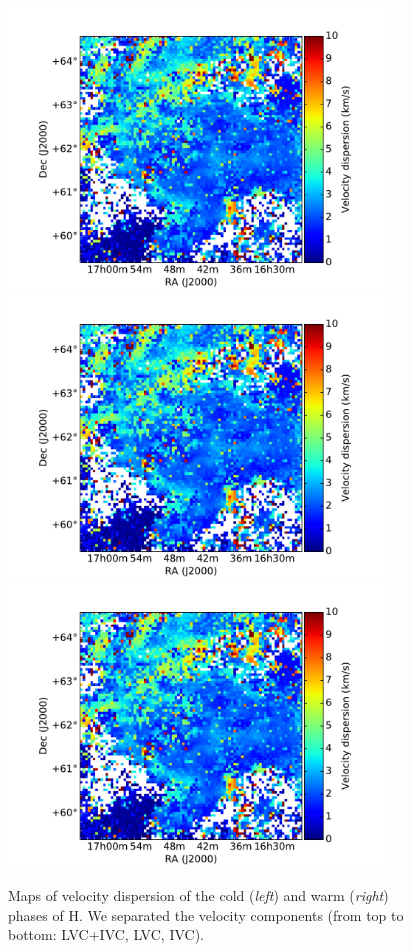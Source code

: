 \documentclass[traditabstract]{aa}
\begin{document}
\begin{figure}[h]
  \hspace{3mm}
  \includegraphics[page=5,height=7.5cm,trim=45 5 65 35,clip=true]{Figures/GHIGLS_disp.pdf} \\
  \vspace{3mm}
  \includegraphics[page=3,height=7.5cm,trim=45 5 65 35,clip=true]{Figures/GHIGLS_disp.pdf}
  \hspace{3mm}
  \includegraphics[page=6,height=7.5cm,trim=45 5 65 35,clip=true]{Figures/GHIGLS_disp.pdf}
  \caption{Maps of velocity dispersion of the cold (\emph{left}) and warm (\emph{right}) phases of H. We separated the velocity components (from top to bottom: LVC+IVC, LVC, IVC).}
\end{figure}
\end{document}
